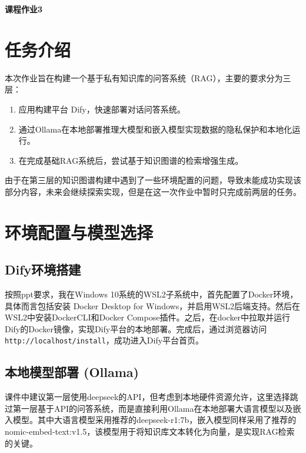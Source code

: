 \documentclass[11pt]{article}
\begin{document}
	\pagestyle{fancy}
	\chead{}
	
	\begin{center}
		{\LARGE \bf 课程作业3} 
	\end{center}
	\begin{center}
		\large{}
	\end{center}

	\section{任务介绍}
	本次作业旨在构建一个基于私有知识库的问答系统（RAG），主要的要求分为三层：
	\begin{enumerate}
		\item 应用构建平台 Dify，快速部署对话问答系统。
		\item 通过Ollama在本地部署推理大模型和嵌入模型实现数据的隐私保护和本地化运行。
		\item 在完成基础RAG系统后，尝试基于知识图谱的检索增强生成。
	\end{enumerate}

	由于在第三层的知识图谱构建中遇到了一些环境配置的问题，导致未能成功实现该部分内容，未来会继续探索实现，但是在这一次作业中暂时只完成前两层的任务。

	\section{环境配置与模型选择}
	\subsection{Dify环境搭建}
	按照ppt要求，我在Windows 10系统的WSL2子系统中，首先配置了Docker环境，具体而言包括安装 Docker Desktop for Windows，并启用WSL2后端支持。然后在WSL2中安装DockerCLI和Docker Compose插件。之后，在docker中拉取并运行Dify的Docker镜像，实现Dify平台的本地部署。完成后，通过浏览器访问 \texttt{http://localhost/install}，成功进入Dify平台首页。

	\subsection{本地模型部署 (Ollama)}
	课件中建议第一层使用deepseek的API，但考虑到本地硬件资源允许，这里选择跳过第一层基于API的问答系统，而是直接利用Ollama在本地部署大语言模型以及嵌入模型。其中大语言模型采用推荐的deepseek-r1:7b，嵌入模型同样采用了推荐的nomic-embed-text:v1.5，该模型用于将知识库文本转化为向量，是实现RAG检索的关键。
\end{document}
